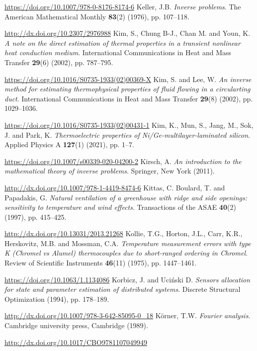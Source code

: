 \begin{thebibliography}{301}
\url{https://doi.org/10.1007/978-0-8176-8174-6}
%
%
 Keller, J.B. {\it Inverse problems}. The American Mathematical Monthly {\bf 83}(2) (1976), pp. 107--118.

\url{http://dx.doi.org/10.2307/2976988}
%
%
 Kim, S., Chung B-J., Chan M. and Youn, K. {\it A note on the direct estimation of thermal properties in a transient nonlinear heat conduction medium}. International Communications in Heat and Mass Transfer {\bf 29}(6) (2002), pp. 787--795.

\url{https://doi.org/10.1016/S0735-1933(02)00369-X}
%
%
 Kim, S. and Lee, W. {\it An inverse method for estimating thermophysical properties of fluid flowing in a circularting duct}. International Communications in Heat and Mass Transfer {\bf 29}(8) (2002), pp. 1029--1036.

\url{https://doi.org/10.1016/S0735-1933(02)00431-1}
%
%
 Kim, K., Mun, S., Jang, M., Sok, J. and Park, K. {\it Thermoelectric properties of Ni/Ge-multilayer-laminated silicon}. Applied Physics A {\bf 127}(1) (2021), pp. 1--7.

\url{https://doi.org/10.1007/s00339-020-04200-2}
%
%
 Kirsch, A. {\it An introduction to the mathematical theory of inverse problems}. Springer, New York (2011).

\url{http://dx.doi.org/10.1007/978-1-4419-8474-6}
%
%
 Kittas, C. Boulard, T. and Papadakis, G. {\it Natural ventilation of a greenhouse with ridge and side openings: sensitivity to temperature and wind effects}. Transactions of the ASAE {\bf 40}(2) (1997), pp. 415--425.

\url{http://dx.doi.org/10.13031/2013.21268}
%
%
 Kollie, T.G., Horton, J.L., Carr, K.R., Herskovitz, M.B. and Mossman, C.A. {\it Temperature measurement errors with type K (Chromel vs Alumel) thermocouples due to short-ranged ordering in Chromel}. Review of Scientific Instruments {\bf 46}(11) (1975), pp. 1447--1461.

\url{https://doi.org/10.1063/1.1134086}
%
%
 Korbicz, J. and Uci\'nski D. {\it Sensors allocation for state and parameter estimation of distributed systems}. Discrete Structural Optimization (1994), pp. 178--189.

\url{http://dx.doi.org/10.1007/978-3-642-85095-0_18}
%
%
 K\"orner, T.W. {\it Fourier analysis}. Cambridge university press, Cambridge (1989).

\url{http://dx.doi.org/10.1017/CBO9781107049949}


\end{thebibliography}
